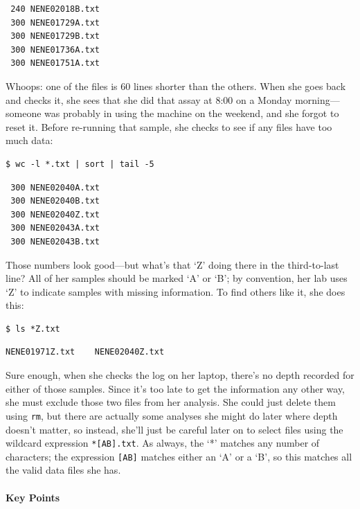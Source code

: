 \documentclass[]{book}
\begin{document}
\begin{verbatim}
 240 NENE02018B.txt
 300 NENE01729A.txt
 300 NENE01729B.txt
 300 NENE01736A.txt
 300 NENE01751A.txt
\end{verbatim}

Whoops: one of the files is 60 lines shorter than the others. When she
goes back and checks it, she sees that she did that assay at 8:00 on a
Monday morning---someone was probably in using the machine on the
weekend, and she forgot to reset it. Before re-running that sample, she
checks to see if any files have too much data:

\begin{verbatim}
$ wc -l *.txt | sort | tail -5
\end{verbatim}

\begin{verbatim}
 300 NENE02040A.txt
 300 NENE02040B.txt
 300 NENE02040Z.txt
 300 NENE02043A.txt
 300 NENE02043B.txt
\end{verbatim}

Those numbers look good---but what's that `Z' doing there in the
third-to-last line? All of her samples should be marked `A' or `B'; by
convention, her lab uses `Z' to indicate samples with missing
information. To find others like it, she does this:

\begin{verbatim}
$ ls *Z.txt
\end{verbatim}

\begin{verbatim}
NENE01971Z.txt    NENE02040Z.txt
\end{verbatim}

Sure enough, when she checks the log on her laptop, there's no depth
recorded for either of those samples. Since it's too late to get the
information any other way, she must exclude those two files from her
analysis. She could just delete them using \texttt{rm}, but there are
actually some analyses she might do later where depth doesn't matter, so
instead, she'll just be careful later on to select files using the
wildcard expression \texttt{*{[}AB{]}.txt}. As always, the `*' matches
any number of characters; the expression \texttt{{[}AB{]}} matches
either an `A' or a `B', so this matches all the valid data files she
has.

\mbox{}\paragraph{Key Points}
\end{document}
